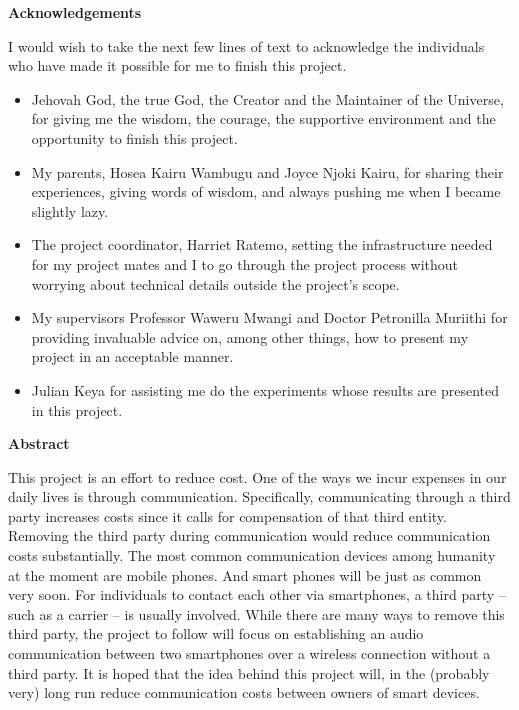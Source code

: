 \documentclass[12pt,svgnames,smaller]{article} %
\begin{document}
\textbf{Acknowledgements}

I would wish to take the next few lines of text to acknowledge the individuals who have made it possible for me to finish this project.

\begin{itemize}
	\item Jehovah God, the true God, the Creator and the Maintainer of the Universe, for giving me the wisdom, the courage, the supportive environment and the opportunity to finish this project.
	\item My parents, Hosea Kairu Wambugu and Joyce Njoki Kairu, for sharing their experiences, giving words of wisdom, and always pushing me when I became slightly lazy.
	\item The project coordinator, Harriet Ratemo, setting the infrastructure needed for my project mates and I to go through the project process without worrying about technical details outside the project's scope.
	\item My supervisors Professor Waweru Mwangi and Doctor Petronilla Muriithi for providing invaluable advice on, among other things, how to present my project in an acceptable manner.
	\item Julian Keya for assisting me do the experiments whose results are presented in this project.
\end{itemize}

\clearpage



\textbf{Abstract}

This project is an effort to reduce cost. One of the ways we incur expenses in our daily lives is through communication. Specifically, communicating through a third party increases costs since it calls for compensation of that third entity. Removing the third party during communication would reduce communication costs substantially. The most common communication devices among humanity at the moment are mobile phones. And smart phones will be just as common very soon. For individuals to contact each other via smartphones, a third party – such as a carrier – is usually involved. While there are many ways to remove this third party, the project to follow will focus on establishing an audio communication between two smartphones over a wireless connection without a third party. It is hoped that the idea behind this project will, in the (probably very) long run reduce communication costs between owners of smart devices. 
\end{document}
